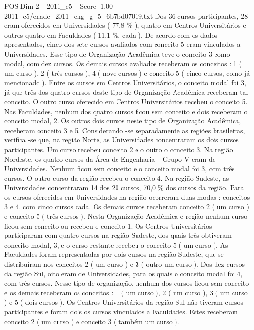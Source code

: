 \begin{textsample}{POS Dim 2 – 2011\_c5 – Score -1.00 – 2011\_c5/enade\_2011\_eng\_g\_5\_6b7bd07019.txt}
Dos 36 cursos participantes, 28 eram oferecidos em Universidades ( 77,8 \% ), quatro em Centros Universitários e outros quatro em Faculdades ( 11,1 \%, cada ).
De acordo com os dados apresentados, cinco dos sete cursos avaliados com conceito 5 eram vinculados a Universidades.
Esse tipo de Organização Acadêmica teve o conceito 3 como modal, com dez cursos.
Os demais cursos avaliados receberam os conceitos : 1 ( um curso ), 2 ( três cursos ), 4 ( nove cursos ) e conceito 5 ( cinco cursos, como já mencionado ).
Entre os cursos em Centros Universitários, o conceito modal foi 3, já que três dos quatro cursos deste tipo de Organização Acadêmica receberam tal conceito.
O outro curso oferecido em Centros Universitários recebeu o conceito 5.
Nas Faculdades, nenhum dos quatro cursos ficou sem conceito e dois receberam o conceito modal, 2.
Os outros dois cursos neste tipo de Organização Acadêmica, receberam conceito 3 e 5.
Considerando -se separadamente as regiões brasileiras, verifica -se que, na região Norte, as Universidades concentraram os dois cursos participantes.
Um curso recebeu conceito 2 e o outro o conceito 3.
Na região Nordeste, os quatro cursos da Área de Engenharia – Grupo V eram de Universidades.
Nenhum ficou sem conceito e o conceito modal foi 3, com três cursos.
O outro curso da região recebeu o conceito 4.
Na região Sudeste, as Universidades concentraram 14 dos 20 cursos, 70,0 \% dos cursos da região.
Para os cursos oferecidos em Universidades na região ocorreram duas modas : conceitos 3 e 4, com cinco cursos cada.
Os demais cursos receberam conceito 2 ( um curso ) e conceito 5 ( três cursos ).
Nesta Organização Acadêmica e região nenhum curso ficou sem conceito ou recebeu o conceito 1.
Os Centros Universitários participaram com quatro cursos na região Sudeste, dos quais três obtiveram conceito modal, 3, e o curso restante recebeu o conceito 5 ( um curso ).
As Faculdades foram representadas por dois cursos na região Sudeste, que se distribuíram nos conceitos 2 ( um curso ) e 3 ( outro um curso ).
Dos dez cursos da região Sul, oito eram de Universidades, para os quais o conceito modal foi 4, com três cursos.
Nesse tipo de organização, nenhum dos cursos ficou sem conceito e os demais receberam os conceitos : 1 ( um curso ), 2 ( um curso ), 3 ( um curso ) e 5 ( dois cursos ).
Os Centros Universitários da região Sul não tiveram cursos participantes e foram dois os cursos vinculados a Faculdades.
Estes receberam conceito 2 ( um curso ) e conceito 3 ( também um curso ).

\end{textsample}
